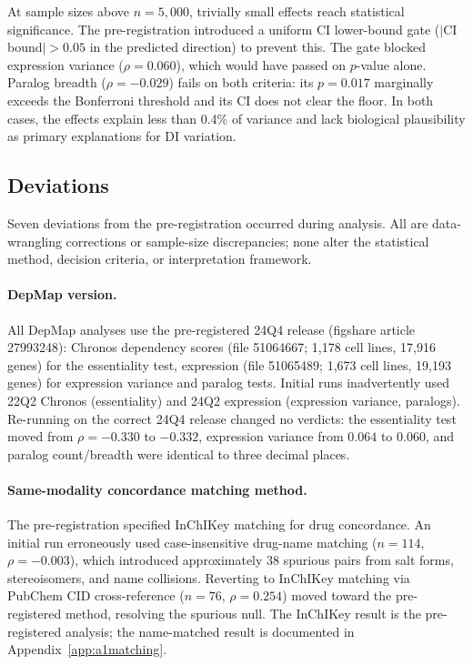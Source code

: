 \documentclass[11pt]{article}
\begin{document}
At sample sizes above $n = 5{,}000$, trivially small effects reach
statistical significance.  The pre-registration introduced a uniform
CI lower-bound gate ($|$CI bound$| > 0.05$ in the predicted direction)
to prevent this.  The gate blocked expression variance
($\rho = 0.060$), which would have passed on $p$-value alone.
Paralog breadth ($\rho = -0.029$) fails on both criteria: its
$p = 0.017$ marginally exceeds the Bonferroni threshold and its CI
does not clear the floor.  In both cases, the effects explain less than
0.4\% of variance and lack biological plausibility as primary
explanations for DI variation.

\subsection{Deviations}

Seven deviations from the pre-registration occurred during analysis.
All are data-wrangling corrections or sample-size discrepancies; none
alter the statistical method, decision criteria, or interpretation
framework.

\paragraph{DepMap version.}
All DepMap analyses use the pre-registered 24Q4 release (figshare
article 27993248): Chronos dependency scores (file 51064667; 1{,}178
cell lines, 17{,}916 genes) for the essentiality test, expression
(file 51065489; 1{,}673 cell lines, 19{,}193 genes) for expression
variance and paralog tests.
Initial runs inadvertently used 22Q2 Chronos (essentiality) and 24Q2
expression (expression variance, paralogs).  Re-running on the correct 24Q4 release changed no
verdicts: the essentiality test moved from $\rho = -0.330$ to $-0.332$,
expression variance from $0.064$ to $0.060$, and paralog count/breadth
were identical to three decimal places.

\paragraph{Same-modality concordance matching method.}
The pre-registration specified InChIKey matching for drug concordance.
An initial run erroneously used case-insensitive drug-name matching
($n = 114$, $\rho = -0.003$), which introduced approximately 38
spurious pairs from salt forms, stereoisomers, and name collisions.
Reverting to InChIKey matching via PubChem CID cross-reference
($n = 76$, $\rho = 0.254$) moved toward the pre-registered method,
resolving the spurious null.  The InChIKey result is the pre-registered analysis; the
name-matched result is documented in Appendix~\ref{app:a1matching}.
\end{document}
